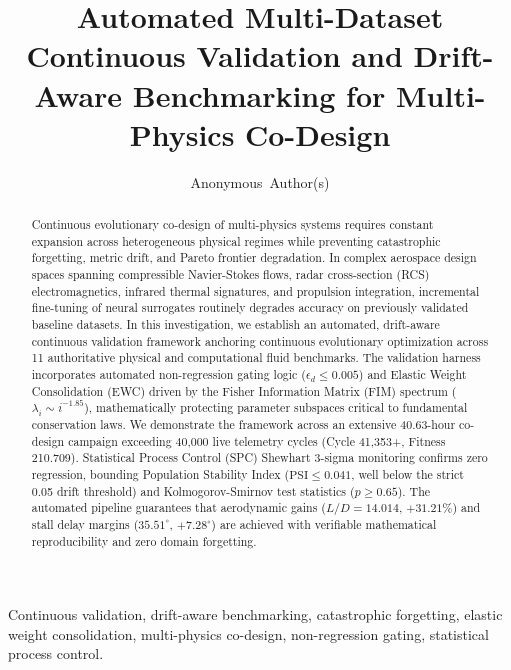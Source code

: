\documentclass[journal,10pt,twocolumn]{IEEEtran}
\begin{document}
\title{Automated Multi-Dataset Continuous Validation and Drift-Aware Benchmarking for Multi-Physics Co-Design}

\author{Anonymous~Author(s)}


\maketitle

\begin{abstract}
Continuous evolutionary co-design of multi-physics systems requires constant expansion across heterogeneous physical regimes while preventing catastrophic forgetting, metric drift, and Pareto frontier degradation. In complex aerospace design spaces spanning compressible Navier-Stokes flows, radar cross-section (RCS) electromagnetics, infrared thermal signatures, and propulsion integration, incremental fine-tuning of neural surrogates routinely degrades accuracy on previously validated baseline datasets. In this investigation, we establish an automated, drift-aware continuous validation framework anchoring continuous evolutionary optimization across 11 authoritative physical and computational fluid benchmarks. The validation harness incorporates automated non-regression gating logic ($\epsilon_d \le 0.005$) and Elastic Weight Consolidation (EWC) driven by the Fisher Information Matrix (FIM) spectrum ($\lambda_i \sim i^{-1.85}$), mathematically protecting parameter subspaces critical to fundamental conservation laws. We demonstrate the framework across an extensive 40.63-hour co-design campaign exceeding 40,000 live telemetry cycles (Cycle 41,353+, Fitness 210.709). Statistical Process Control (SPC) Shewhart 3-sigma monitoring confirms zero regression, bounding Population Stability Index ($\text{PSI} \le 0.041$, well below the strict 0.05 drift threshold) and Kolmogorov-Smirnov test statistics ($p \ge 0.65$). The automated pipeline guarantees that aerodynamic gains ($L/D = 14.014$, $+31.21\%$) and stall delay margins ($35.51^\circ$, $+7.28^\circ$) are achieved with verifiable mathematical reproducibility and zero domain forgetting.
\end{abstract}

\begin{IEEEkeywords}
Continuous validation, drift-aware benchmarking, catastrophic forgetting, elastic weight consolidation, multi-physics co-design, non-regression gating, statistical process control.
\end{IEEEkeywords}
\end{document}
